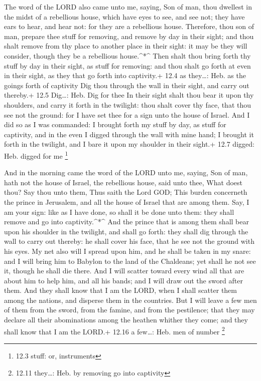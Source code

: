  The word of the LORD also came unto me, saying,
 Son of man, thou dwellest in the midst of a rebellious
house, which have eyes to see, and see not; they have ears to hear, and
hear not: for they are a rebellious house.  Therefore, thou
son of man, prepare thee stuff for removing, and remove by day in their
sight; and thou shalt remove from thy place to another place in their
sight: it may be they will consider, though they be a rebellious
house.\^{}*\^{}  Then shalt thou bring forth thy stuff by
day in their sight, as stuff for removing: and thou shalt go forth at
even in their sight, as they that go forth into captivity.+ 12.4 as
they\ldots: Heb. as the goings forth of captivity  Dig thou
through the wall in their sight, and carry out thereby.+ 12.5 Dig\ldots:
Heb. Dig for thee  In their sight shalt thou bear it upon
thy shoulders, and carry it forth in the twilight: thou shalt cover thy
face, that thou see not the ground: for I have set thee for a sign unto
the house of Israel.  And I did so as I was commanded: I
brought forth my stuff by day, as stuff for captivity, and in the even I
digged through the wall with mine hand; I brought it forth in the
twilight, and I bare it upon my shoulder in their sight.+ 12.7 digged:
Heb. digged for me \footnote{12.3 stuff: or, instruments}

 And in the morning came the word of the LORD unto me,
saying,  Son of man, hath not the house of Israel, the
rebellious house, said unto thee, What doest thou?  Say
thou unto them, Thus saith the Lord GOD; This burden concerneth the
prince in Jerusalem, and all the house of Israel that are among them.
 Say, I am your sign: like as I have done, so shall it be
done unto them: they shall remove and go into captivity.\^{}*\^{}
 And the prince that is among them shall bear upon his
shoulder in the twilight, and shall go forth: they shall dig through the
wall to carry out thereby: he shall cover his face, that he see not the
ground with his eyes.  My net also will I spread upon him,
and he shall be taken in my snare: and I will bring him to Babylon to
the land of the Chaldeans; yet shall he not see it, though he shall die
there.  And I will scatter toward every wind all that are
about him to help him, and all his bands; and I will draw out the sword
after them.  And they shall know that I am the LORD, when I
shall scatter them among the nations, and disperse them in the
countries.  But I will leave a few men of them from the
sword, from the famine, and from the pestilence; that they may declare
all their abominations among the heathen whither they come; and they
shall know that I am the LORD.+ 12.16 a few\ldots: Heb. men of number
\footnote{12.11 they\ldots: Heb. by removing go into captivity}

